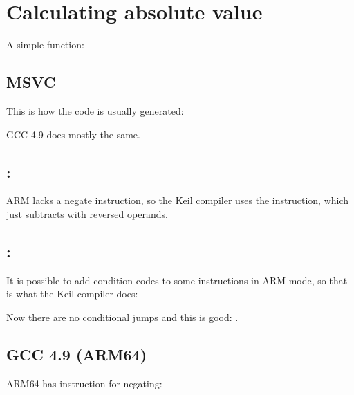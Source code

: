 \section{Calculating absolute value}
\label{sec:abs}

A simple function:



\subsection{\Optimizing MSVC}

This is how the code is usually generated:



GCC 4.9 does mostly the same.

\subsection{\OptimizingKeilVI: \ThumbMode}




ARM lacks a negate instruction, so the Keil compiler uses the  instruction, which just subtracts with reversed operands.

\subsection{\OptimizingKeilVI: \ARMMode}

It is possible to add condition codes to some instructions in ARM mode, so that is what the Keil compiler does:



Now there are no conditional jumps and this is good: .

\subsection{\NonOptimizing GCC 4.9 (ARM64)}


ARM64 has instruction  for negating:

